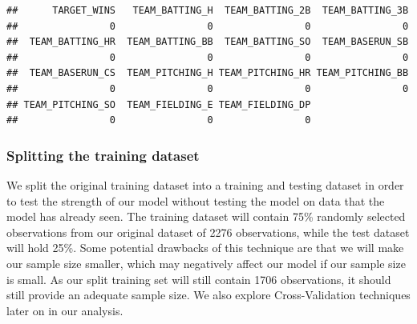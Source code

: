 \documentclass[
]{article}
\newenvironment{Shaded}{\begin{snugshade}}{\end{snugshade}}
\newcommand{\AttributeTok}[1]{\textcolor[rgb]{0.13,0.29,0.53}{#1}}
\newcommand{\CommentTok}[1]{\textcolor[rgb]{0.56,0.35,0.01}{\textit{#1}}}
\newcommand{\DecValTok}[1]{\textcolor[rgb]{0.00,0.00,0.81}{#1}}
\newcommand{\FunctionTok}[1]{\textcolor[rgb]{0.13,0.29,0.53}{\textbf{#1}}}
\newcommand{\NormalTok}[1]{#1}
\newcommand{\OtherTok}[1]{\textcolor[rgb]{0.56,0.35,0.01}{#1}}
\newcommand{\SpecialCharTok}[1]{\textcolor[rgb]{0.81,0.36,0.00}{\textbf{#1}}}
\begin{document}
\begin{Shaded}
\end{Shaded}

\begin{verbatim}
##      TARGET_WINS   TEAM_BATTING_H  TEAM_BATTING_2B  TEAM_BATTING_3B 
##                0                0                0                0 
##  TEAM_BATTING_HR  TEAM_BATTING_BB  TEAM_BATTING_SO  TEAM_BASERUN_SB 
##                0                0                0                0 
##  TEAM_BASERUN_CS  TEAM_PITCHING_H TEAM_PITCHING_HR TEAM_PITCHING_BB 
##                0                0                0                0 
## TEAM_PITCHING_SO  TEAM_FIELDING_E TEAM_FIELDING_DP 
##                0                0                0
\end{verbatim}

\subsubsection{Splitting the training
dataset}\label{splitting-the-training-dataset}

We split the original training dataset into a training and testing
dataset in order to test the strength of our model without testing the
model on data that the model has already seen. The training dataset will
contain 75\% randomly selected observations from our original dataset of
2276 observations, while the test dataset will hold 25\%. Some potential
drawbacks of this technique are that we will make our sample size
smaller, which may negatively affect our model if our sample size is
small. As our split training set will still contain 1706 observations,
it should still provide an adequate sample size. We also explore
Cross-Validation techniques later on in our analysis.
\end{document}
